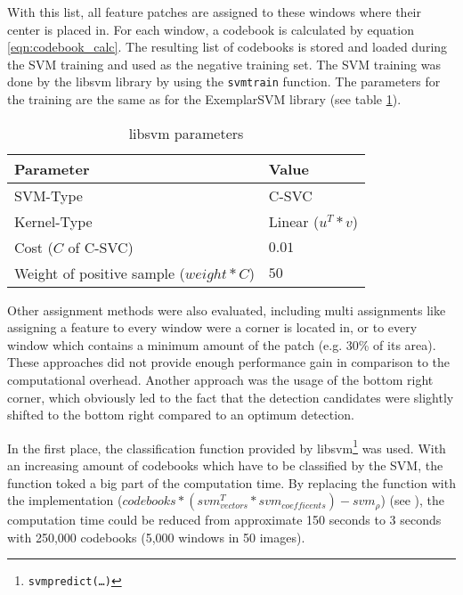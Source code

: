 With this list, all feature patches are assigned to these windows where their center is placed in. For each window, a codebook is calculated by equation \ref{eqn:codebook_calc}. The resulting list of codebooks is stored and loaded during the \ac{SVM} training and used as the negative training set. The \ac{SVM} training was done by the libsvm library \cite{Chang:2011:LLS:1961189.1961199} by using the \texttt{svmtrain} function. The parameters for the training are the same as for the ExemplarSVM library \cite{Malisiewicz2011} (see table \ref{tab:libsvm_train_params}).

\begin{table}
    \begin{tabular}{|l|l|}
        \hline
        \textbf{Parameter} & \textbf{Value} \\ 
        \hline
        SVM-Type           & C-SVC \\ 
        \hline
        Kernel-Type        & Linear ($u^T*v$) \\ 
        \hline
        Cost ($C$ of C-SVC)  & $0.01$ \\ 
        \hline
        Weight of positive sample ($weight*C$) & $50$ \\ 
        \hline
    \end{tabular}
    \caption{libsvm parameters}
    \label{tab:libsvm_train_params}
\end{table}

Other assignment methods were also evaluated, including multi assignments like assigning a feature to every window were a corner is located in, or to every window which contains a minimum amount of the patch (e.g. 30\% of its area). These approaches did not provide enough performance gain in comparison to the computational overhead. Another approach was the usage of the bottom right corner, which obviously led to the fact that the detection candidates were slightly shifted to the bottom right compared to an optimum detection. 

In the first place, the classification function provided by libsvm\footnote{\texttt{svmpredict(\dots)}} was used. With an increasing amount of codebooks which have to be classified by the \ac{SVM}, the function toked a big part of the computation time. By replacing the function with the \MATLAB implementation ($codebooks * (svm_{vectors}^T * svm_{coefficents}) - svm_{\rho}$) (see ), the computation time could be reduced from approximate 150 seconds to 3 seconds with 250,000 codebooks (5,000 windows in 50 images).

